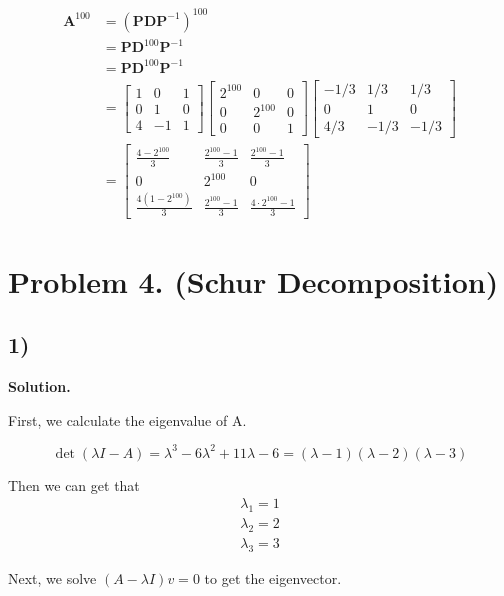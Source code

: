 \documentclass{article}
\newcommand{\0}{{\mathbf{0}}} %
\newcommand{\A}{{\mathbf{A}}} %
\begin{document}
\begin{align*}
\A^{100} &= (\mathbf{P}\mathbf{D}\mathbf{P}^{-1})^100   \\
&= \mathbf{P}\mathbf{D}^{100}\mathbf{P}^{-1}  \\
&= \mathbf{P}\mathbf{D}^{100}\mathbf{P}^{-1} \\
&=
\begin{bmatrix} 1 & 0 & 1 \\ 0 & 1 & 0 \\ 4 & -1 & 1
\end{bmatrix}
\begin{bmatrix} 2^{100} & 0 & 0 \\ 0 & 2^{100} & 0 \\ 0 & 0 & 1
\end{bmatrix}
\begin{bmatrix} -1/3 & 1/3 & 1/3 \\ 0 & 1 & 0 \\ 4/3 & -1/3 & -1/3
\end{bmatrix} \\
&=
\begin{bmatrix}
\frac{4 - 2^{100}}{3} & \frac{2^{100}-1}{3} & \frac{2^{100}-1}{3} \\[6pt]
0 & 2^{100} & 0 \\[6pt]
\frac{4(1-2^{100})}{3} & \frac{2^{100}-1}{3} & \frac{4\cdot 2^{100}-1}{3}
\end{bmatrix}
\end{align*}

\section*{Problem 4. (Schur Decomposition)}

\subsection*{1)}

\textbf{Solution.}

First, we calculate the eigenvalue of A.

$$\det(\lambda I - A) = \lambda^3 - 6\lambda^2 + 11\lambda - 6 = (\lambda-1)(\lambda-2)(\lambda-3)$$

Then we can get that
\begin{align*}
\lambda_1 = 1   \\
\lambda_2 = 2   \\
\lambda_3 = 3
\end{align*}

Next, we solve $(A-\lambda I)v=0$ to get the eigenvector.
\end{document}
